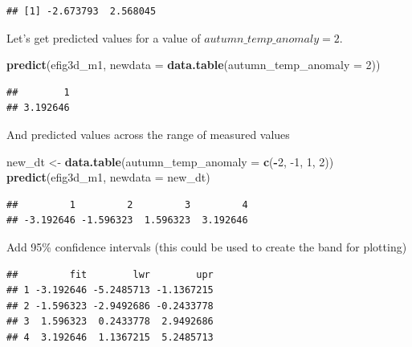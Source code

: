 \documentclass[]{book}
\newenvironment{Shaded}{\begin{snugshade}}{\end{snugshade}}
\newcommand{\DataTypeTok}[1]{\textcolor[rgb]{0.13,0.29,0.53}{#1}}
\newcommand{\DecValTok}[1]{\textcolor[rgb]{0.00,0.00,0.81}{#1}}
\newcommand{\KeywordTok}[1]{\textcolor[rgb]{0.13,0.29,0.53}{\textbf{#1}}}
\newcommand{\NormalTok}[1]{#1}
\newcommand{\OperatorTok}[1]{\textcolor[rgb]{0.81,0.36,0.00}{\textbf{#1}}}
\newcommand{\OtherTok}[1]{\textcolor[rgb]{0.56,0.35,0.01}{#1}}
\newcommand{\StringTok}[1]{\textcolor[rgb]{0.31,0.60,0.02}{#1}}
\begin{document}
\begin{verbatim}
## [1] -2.673793  2.568045
\end{verbatim}

Let's get predicted values for a value of \(autumn\_temp\_anomaly = 2\).

\begin{Shaded}
\begin{Highlighting}[]
\KeywordTok{predict}\NormalTok{(efig3d_m1, }\DataTypeTok{newdata =} \KeywordTok{data.table}\NormalTok{(}\DataTypeTok{autumn_temp_anomaly =} \DecValTok{2}\NormalTok{))}
\end{Highlighting}
\end{Shaded}

\begin{verbatim}
##        1 
## 3.192646
\end{verbatim}

And predicted values across the range of measured values

\begin{Shaded}
\begin{Highlighting}[]
\NormalTok{new_dt <-}\StringTok{ }\KeywordTok{data.table}\NormalTok{(}\DataTypeTok{autumn_temp_anomaly =} \KeywordTok{c}\NormalTok{(}\OperatorTok{-}\DecValTok{2}\NormalTok{, }\DecValTok{-1}\NormalTok{, }\DecValTok{1}\NormalTok{, }\DecValTok{2}\NormalTok{))}
\KeywordTok{predict}\NormalTok{(efig3d_m1, }\DataTypeTok{newdata =}\NormalTok{ new_dt)}
\end{Highlighting}
\end{Shaded}

\begin{verbatim}
##         1         2         3         4 
## -3.192646 -1.596323  1.596323  3.192646
\end{verbatim}

Add 95\% confidence intervals (this could be used to create the band for plotting)

\begin{Shaded}
\end{Shaded}

\begin{verbatim}
##         fit        lwr        upr
## 1 -3.192646 -5.2485713 -1.1367215
## 2 -1.596323 -2.9492686 -0.2433778
## 3  1.596323  0.2433778  2.9492686
## 4  3.192646  1.1367215  5.2485713
\end{verbatim}
\end{document}
